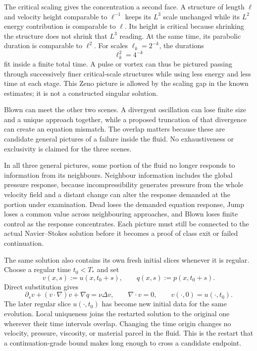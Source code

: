The critical scaling gives the concentration a second face.
A structure of length \(\ell\) and velocity height comparable to \(\ell^{-1}\) keeps its \(L^3\) scale unchanged while its \(L^2\) energy contribution is comparable to \(\ell\).
Its height is critical because shrinking the structure does not shrink that \(L^3\) reading.
At the same time, its parabolic duration is comparable to \(\ell^2\).
For scales \(\ell_k=2^{-k}\), the durations
\[
  \ell_k^2=4^{-k}
\]
fit inside a finite total time.
A pulse or vortex can thus be pictured passing through successively finer critical-scale structures while using less energy and less time at each stage.
This Zeno picture is allowed by the scaling gap in the known estimates; it is not a constructed singular solution.

Blown can meet the other two scenes.
A divergent oscillation can lose finite size and a unique approach together, while a proposed truncation of that divergence can create an equation mismatch.
The overlap matters because these are candidate general pictures of a failure inside the fluid.
No exhaustiveness or exclusivity is claimed for the three scenes.

In all three general pictures, some portion of the fluid no longer responds to information from its neighbours.
Neighbour information includes the global pressure response, because incompressibility generates pressure from the whole velocity field and a distant change can alter the response demanded at the portion under examination.
Dead loses the demanded equation response, Jump loses a common value across neighbouring approaches, and Blown loses finite control as the response concentrates.
Each picture must still be connected to the actual Navier--Stokes solution before it becomes a proof of class exit or failed continuation.


The same solution also contains its own fresh initial slices whenever it is regular.
Choose a regular time \(t_0<T_*\) and set
\[
  v(x,s):=u(x,t_0+s),
  \qquad
  q(x,s):=p(x,t_0+s).
\]
Direct substitution gives
\[
  \partial_sv+(v\cdot\nabla)v+\nabla q
  =
  \nu\Delta v,
  \qquad
  \nabla\cdot v=0,
  \qquad
  v(\cdot,0)=u(\cdot,t_0).
\]
The later regular slice \(u(\cdot,t_0)\) has become new initial data for the same evolution.
Local uniqueness joins the restarted solution to the original one wherever their time intervals overlap.
Changing the time origin changes no velocity, pressure, viscosity, or material parcel in the fluid.
This is the restart that a continuation-grade bound makes long enough to cross a candidate endpoint.
